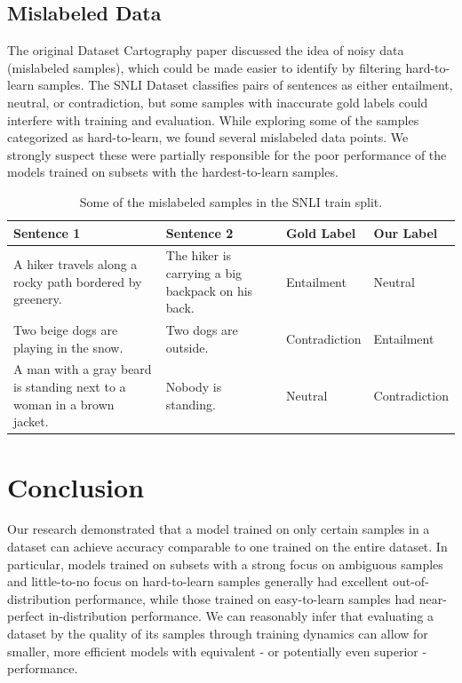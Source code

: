 \documentclass[11pt, a4paper, twocolumn]{article}
\begin{document}
	\subsection{Mislabeled Data}
	
	The original Dataset Cartography paper discussed the idea of noisy data (mislabeled samples), which could be made easier to identify by filtering hard-to-learn samples. The SNLI Dataset classifies pairs of sentences as either entailment, neutral, or contradiction, but some samples with inaccurate gold labels could interfere with training and evaluation. While exploring some of the samples categorized as hard-to-learn, we found several mislabeled data points. We strongly suspect these were partially responsible for the poor performance of the models trained on subsets with the hardest-to-learn samples.
	
	\begin{table}[!ht]
		\centering
		\begin{tabular}{| m{4.5cm} | m{4.5cm}| m{2.5cm} | m{2.5cm} |}
			\hline
			Sentence 1                                                             & Sentence 2                                        & Gold Label    & Our Label     \\ \hline
			A hiker travels along a rocky path bordered by greenery.               & The hiker is carrying a big backpack on his back. & Entailment    & Neutral       \\ \hline 
			Two beige dogs are playing in the snow.                                & Two dogs are outside.                             & Contradiction & Entailment    \\ \hline
			A man with a gray beard is standing next to a woman in a brown jacket. & Nobody is standing.                               & Neutral       & Contradiction \\
			\hline
		\end{tabular}
		\caption{Some of the mislabeled samples in the SNLI train split.}
	\end{table}
	
	\section{Conclusion}
	
	Our research demonstrated that a model trained on only certain samples in a dataset can achieve accuracy comparable to one trained on the entire dataset. In particular, models trained on subsets with a strong focus on ambiguous samples and little-to-no focus on hard-to-learn samples generally had excellent out-of-distribution performance, while those trained on easy-to-learn samples had near-perfect in-distribution performance. We can reasonably infer that evaluating a dataset by the quality of its samples through training dynamics can allow for smaller, more efficient models with equivalent - or potentially even superior - performance. 
	
\end{document}
